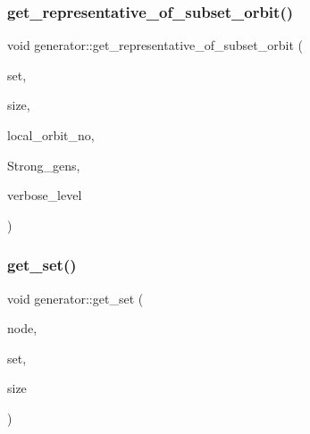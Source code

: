 \mbox{\label{classgenerator_a2b7f5c003e3da5378b724698aa992d9a}} 
\subsubsection{\texorpdfstring{get\+\_\+representative\+\_\+of\+\_\+subset\+\_\+orbit()}{get\_representative\_of\_subset\_orbit()}}
{\footnotesize\ttfamily void generator\+::get\+\_\+representative\+\_\+of\+\_\+subset\+\_\+orbit (\begin{DoxyParamCaption}\item[{\mbox{\hyperlink{galois_8h_a09fddde158a3a20bd2dcadb609de11dc}{I\+NT}} $\ast$}]{set,  }\item[{\mbox{\hyperlink{galois_8h_a09fddde158a3a20bd2dcadb609de11dc}{I\+NT}}}]{size,  }\item[{\mbox{\hyperlink{galois_8h_a09fddde158a3a20bd2dcadb609de11dc}{I\+NT}}}]{local\+\_\+orbit\+\_\+no,  }\item[{\mbox{\hyperlink{classstrong__generators}{strong\+\_\+generators}} $\ast$\&}]{Strong\+\_\+gens,  }\item[{\mbox{\hyperlink{galois_8h_a09fddde158a3a20bd2dcadb609de11dc}{I\+NT}}}]{verbose\+\_\+level }\end{DoxyParamCaption})}

\mbox{\label{classgenerator_ad17922da9bcefd923c0b85b70bd7af67}} 
\subsubsection{\texorpdfstring{get\+\_\+set()}{get\_set()}\hspace{0.1cm}{\footnotesize\ttfamily [1/2]}}
{\footnotesize\ttfamily void generator\+::get\+\_\+set (\begin{DoxyParamCaption}\item[{\mbox{\hyperlink{galois_8h_a09fddde158a3a20bd2dcadb609de11dc}{I\+NT}}}]{node,  }\item[{\mbox{\hyperlink{galois_8h_a09fddde158a3a20bd2dcadb609de11dc}{I\+NT}} $\ast$}]{set,  }\item[{\mbox{\hyperlink{galois_8h_a09fddde158a3a20bd2dcadb609de11dc}{I\+NT}} \&}]{size }\end{DoxyParamCaption})}

